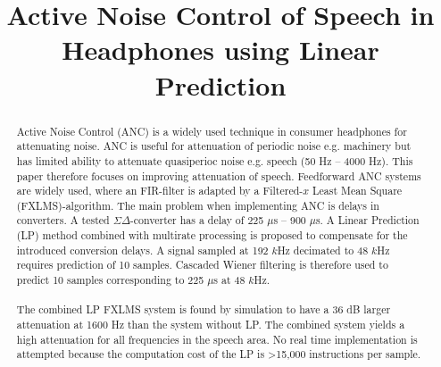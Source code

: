 \documentclass[conference]{IEEEtran}
\begin{document}
\title{Active Noise Control of Speech in Headphones using Linear Prediction}

\author{
}

\maketitle

\begin{abstract}
Active Noise Control (ANC) is a widely used technique in consumer headphones for attenuating noise. ANC is useful for attenuation of periodic noise e.g. machinery but has limited ability to attenuate quasiperioc noise e.g. speech (50 Hz -- 4000 Hz). This paper therefore focuses on improving attenuation of speech. Feedforward ANC systems are widely used, where an FIR-filter is adapted by a Filtered-$x$ Least Mean Square (FXLMS)-algorithm. The main problem when implementing ANC is delays in converters. A tested $\Sigma\Delta$-converter has a delay of 225 $\mu$s -- 900 $\mu$s. A Linear Prediction (LP) method combined with multirate processing is proposed to compensate for the introduced conversion delays. A signal sampled at 192 $k$Hz decimated to 48 $k$Hz requires prediction of 10 samples.   Cascaded Wiener filtering is therefore used to predict 10 samples corresponding to 225 $\mu$s at 48 $k$Hz. 
\\\\
The combined LP FXLMS system is found by simulation to have a 36 dB larger attenuation at 1600 Hz than the system without LP. The combined system yields a high attenuation for all frequencies in the speech area. No real time implementation is attempted because the computation cost of the LP is >15,000 instructions per sample. %
	

\end{abstract}
\end{document}
